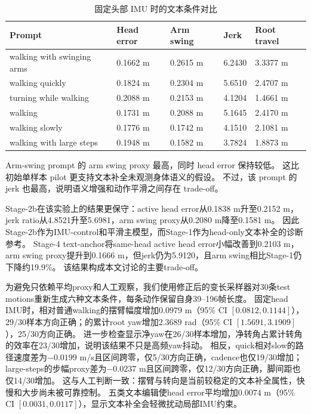 \begin{table}[t]
\centering
\caption{固定头部 IMU 时的文本条件对比}
\label{tab:result-14}
\footnotesize
\setlength{\tabcolsep}{3pt}
\renewcommand{\arraystretch}{1.15}
\begin{tabularx}{\linewidth}{LLLLL}
\toprule
Prompt & Head error & Arm swing & Jerk & Root travel \\
\midrule
walking with swinging arms & 0.1662 m & 0.2615 m & 6.2430 & 3.3377 m \\
walking quickly & 0.1824 m & 0.2304 m & 5.6510 & 2.4707 m \\
turning while walking & 0.2088 m & 0.2153 m & 4.1204 & 1.4661 m \\
walking & 0.1731 m & 0.2088 m & 5.1645 & 2.4170 m \\
walking slowly & 0.1776 m & 0.1742 m & 4.1510 & 2.1081 m \\
walking with large steps & 0.1948 m & 0.1582 m & 3.7824 & 1.8873 m \\
\bottomrule
\end{tabularx}
\end{table}


Arm-swing prompt 的 arm swing proxy 最高，同时 head error 保持较低。
这比初始单样本 pilot 更支持文本补全未观测身体语义的假设。
不过，该 prompt 的 jerk 也最高，说明语义增强和动作平滑之间存在 trade-off。

Stage-2b在该实验上的结果更保守：active head error从0.1838 m升至0.2152 m，jerk ratio从4.8521升至5.6981，arm swing proxy从0.2080 m降至0.1581 m。
因此Stage-2b作为IMU-control和平滑主模型，而Stage-1作为head-only文本补全的诊断参考。
Stage-4 text-anchor将same-head active head error小幅改善到0.2103 m，arm swing proxy提升到0.1666 m，但jerk仍为5.9120，且arm swing相比Stage-1仍下降约19.9\%。
该结果构成本文讨论的主要trade-off。

为避免只依赖平均proxy和人工观察，我们使用修正后的变长采样器对30条test motions重新生成六种文本条件，每条动作保留自身39--196帧长度。
固定head IMU时，\texttt{}相对普通walking的摆臂幅度增加$0.0979$ m（95\% CI $[0.0812,0.1144]$），29/30样本方向正确；\texttt{}的累计root yaw增加$2.3689$ rad（95\% CI $[1.5691,3.1909]$），25/30方向正确。
进一步检查显示净yaw在26/30样本增加，净转角占累计转角的效率在23/30增加，说明该结果不只是高频yaw抖动。
相反，quick相对slow的路径速度差为$-0.0199$ m/s且区间跨零，仅5/30方向正确，cadence也仅19/30增加；large-steps的步幅proxy差为$-0.0237$ m且区间跨零，仅12/30方向正确，脚间距也仅14/30增加。
这与人工判断一致：摆臂与转向是当前较稳定的文本补全属性，快慢和大步尚未被可靠控制。
五类文本编辑使head error平均增加$0.0074$ m（95\% CI $[0.0031,0.0117]$），显示文本补全会轻微扰动局部IMU约束。

